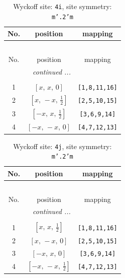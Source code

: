 \documentclass[fleqn,8pt]{jsarticle}
\begin{document}
\renewcommand{\arraystretch}{1.2}
\begin{longtable}{ccc}
\caption{Wyckoff site: {\tt 4i}, site symmetry: {\tt m'.2'm}}
 \\
 \hline \hline
No. & position & mapping \\ \hline \endfirsthead

\multicolumn{2}{l}{\tablename\ \thetable{}} \\
 \hline \hline
No. & position & mapping \\ \hline \endhead

 \hline \hline
\multicolumn{2}{r}{\footnotesize\it continued ...} \\ \endfoot

 \hline \hline
\multicolumn{2}{r}{} \\ \endlastfoot

1 & $\left[ x,\, x,\, 0 \right]$ & {\tt [1,8,11,16]} \\ \hline
2 & $\left[ x,\, - x,\, \frac{1}{2} \right]$ & {\tt [2,5,10,15]} \\ \hline
3 & $\left[ - x,\, x,\, \frac{1}{2} \right]$ & {\tt [3,6,9,14]} \\ \hline
4 & $\left[ - x,\, - x,\, 0 \right]$ & {\tt [4,7,12,13]} \\
\end{longtable}
\renewcommand{\arraystretch}{1.2}
\begin{longtable}{ccc}
\caption{Wyckoff site: {\tt 4j}, site symmetry: {\tt m'.2'm}}
 \\
 \hline \hline
No. & position & mapping \\ \hline \endfirsthead

\multicolumn{2}{l}{\tablename\ \thetable{}} \\
 \hline \hline
No. & position & mapping \\ \hline \endhead

 \hline \hline
\multicolumn{2}{r}{\footnotesize\it continued ...} \\ \endfoot

 \hline \hline
\multicolumn{2}{r}{} \\ \endlastfoot

1 & $\left[ x,\, x,\, \frac{1}{2} \right]$ & {\tt [1,8,11,16]} \\ \hline
2 & $\left[ x,\, - x,\, 0 \right]$ & {\tt [2,5,10,15]} \\ \hline
3 & $\left[ - x,\, x,\, 0 \right]$ & {\tt [3,6,9,14]} \\ \hline
4 & $\left[ - x,\, - x,\, \frac{1}{2} \right]$ & {\tt [4,7,12,13]} \\
\end{longtable}
\end{document}
